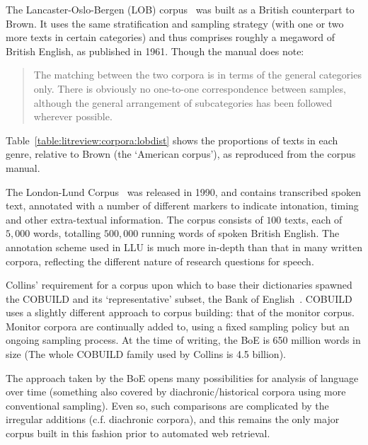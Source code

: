 The Lancaster-Oslo-Bergen (LOB) corpus~\cite{johansson1986tagged} was built as a British counterpart to Brown.  
It uses the same stratification and sampling strategy (with one or two more texts in certain categories) and thus comprises roughly a megaword of British English, as published in 1961.  %
Though the manual does note:

\begin{quote}
    The matching between the two corpora is in terms of the general categories only. There is obviously no one-to-one correspondence between samples, although the general arrangement of subcategories has been followed wherever possible.
\end{quote}

Table~\ref{table:litreview:corpora:lobdist} shows the proportions of texts in each genre, relative to Brown (the `American corpus'), as reproduced from the corpus manual.

The London-Lund Corpus~\cite{greenbaum1990london} was released in 1990, and contains transcribed spoken text, annotated with a number of different markers to indicate intonation, timing and other extra-textual information.  
The corpus consists of $100$ texts, each of $5,000$ words, totalling $500,000$ running words of spoken British English.
The annotation scheme used in LLU is much more in-depth than that in many written corpora, reflecting the different nature of research questions for speech.



Collins' requirement for a corpus upon which to base their dictionaries spawned the COBUILD and its `representative' subset, the Bank of English~\cite{Jarvinen1994AMW991886.991985,sinclair1987looking}.  COBUILD uses a slightly different approach to corpus building: that of the monitor corpus.  Monitor corpora are continually added to, using a fixed sampling policy but an ongoing sampling process.  At the time of writing, the BoE is 650 million words in size (The whole COBUILD family used by Collins is 4.5 billion)\cite{collinswebcorpus}.

The approach taken by the BoE opens many possibilities for analysis of language over time (something also covered by diachronic/historical corpora using more conventional sampling).  Even so, such comparisons are complicated by the irregular additions (c.f. diachronic corpora), and this remains the only major corpus built in this fashion prior to automated web retrieval.


